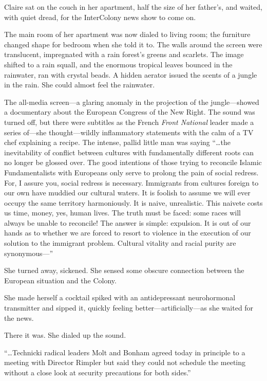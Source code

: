Claire sat on the couch in her apartment, half the size of her father's, and waited, with quiet dread, for the InterColony news show to come on.

The main room of her apartment was now dialed to living room; the furniture changed shape for bedroom when she told it to. The walls around the screen were translucent, impregnated with a rain forest's greens and scarlets. The image shifted to a rain squall, and the enormous tropical leaves bounced in the rainwater, ran with crystal beads. A hidden aerator issued the scents of a jungle in the rain. She could almost feel the rainwater.

The all-media screen---a glaring anomaly in the projection of the jungle---showed a documentary about the European Congress of the New Right. The sound was turned off, but there were subtitles as the French \textit{Front National} leader made a series of---she thought---wildly inflammatory statements with the calm of a TV chef explaining a recipe. The intense, pallid little man was saying ``\ldots the inevitability of conflict between cultures with fundamentally different roots can no longer be glossed over. The good intentions of those trying to reconcile Islamic Fundamentalists with Europeans only serve to prolong the pain of social redress. For, I assure you, social redress is necessary. Immigrants from cultures foreign to our own have muddied our cultural waters. It is foolish to assume we will ever occupy the same territory harmoniously. It is naive, unrealistic. This naivete costs us time, money, yes, human lives. The truth must be faced: some races will always be unable to reconcile! The answer is simple: expulsion. It is out of our hands as to whether we are forced to resort to violence in the execution of our solution to the immigrant problem. Cultural vitality and racial purity are synonymous---''

She turned away, sickened. She sensed some obscure connection between the European situation and the Colony.

She made herself a cocktail spiked with an antidepressant neurohormonal transmitter and sipped it, quickly feeling better---artificially---as she waited for the news.

There it was. She dialed up the sound.

``\ldots Technicki radical leaders Molt and Bonham agreed today in principle to a meeting with Director Rimpler but said they could not schedule the meeting without a close look at security precautions for both sides.''

